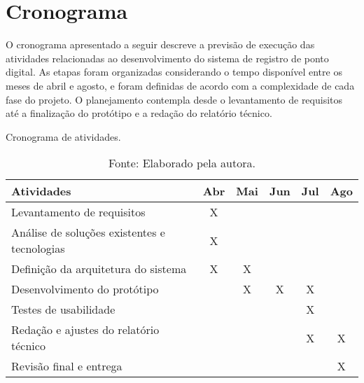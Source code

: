 \chapter{Cronograma}

O cronograma apresentado a seguir descreve a previsão de execução das atividades relacionadas ao desenvolvimento do sistema de registro de ponto digital. As etapas foram organizadas considerando o tempo disponível entre os meses de abril e agosto, e foram definidas de acordo com a complexidade de cada fase do projeto. O planejamento contempla desde o levantamento de requisitos até a finalização do protótipo e a redação do relatório técnico. 


\begin{table}[h]
    \centering
    \caption{Cronograma de atividades.}
    \renewcommand{\arraystretch}{1.3}
    \begin{tabular}{|l|c|c|c|c|c|}
        \hline
        \textbf{Atividades} & \textbf{Abr} & \textbf{Mai} & \textbf{Jun} & \textbf{Jul} & \textbf{Ago} \\
        \hline
        Levantamento de requisitos & X &  &   &   &   \\
        \hline
        Análise de soluções existentes e tecnologias &  X &  & &   &   \\
        \hline
        Definição da arquitetura do sistema &   X & X &  & &   \\
        \hline
        Desenvolvimento do protótipo &   &   X & X & X & \\
        \hline
        Testes de usabilidade &   &   &   &   X &  \\
        \hline
        Redação e ajustes do relatório técnico &   &   &  & X & X \\
        \hline
        Revisão final e entrega &   &   &   &   &  X \\
        \hline
    \end{tabular}
    \vspace{5pt}
    \caption*{Fonte: Elaborado pela autora.}
    \label{tab:cronograma}
\end{table}
